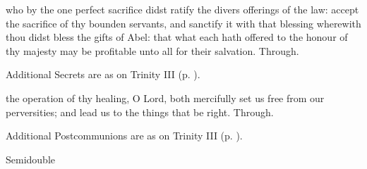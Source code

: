 \secret
{} who by the one perfect sacrifice didst ratify the divers offerings of the law: accept the sacrifice of thy bounden servants, and sanctify it with that blessing wherewith thou didst bless the gifts of Abel: that what each hath offered to the honour of thy majesty may be profitable unto all for their salvation. Through.
\begin{rubric}
    Additional Secrets are as on Trinity III (p. \pageref{TrinityIII}).
\end{rubric}


\postcommunion
{} the operation of thy healing, O Lord, both mercifully set us free from our perversities; and lead us to the things that be right. Through.
\begin{rubric}
    Additional Postcommunions are as on Trinity III (p. \pageref{TrinityIII}).
\end{rubric}

\begin{inhead}
{Semidouble}
\end{inhead}
\par\noindent
{}


